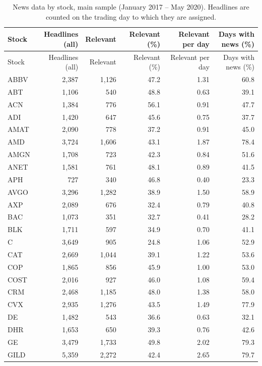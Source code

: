 \documentclass[12pt,a4paper]{article}
\begin{document}
\begin{longtable}{lrrrrr}
\caption[News data by stock, main sample]{News data by stock, main sample (January 2017 -- May 2020). Headlines are counted on the trading day to which they are assigned.}\label{tab:app-stock-news}\\
\toprule
Stock & Headlines (all) & Relevant & Relevant (\%) & Relevant per day & Days with news (\%) \\
\midrule
\endfirsthead
\toprule
Stock & Headlines (all) & Relevant & Relevant (\%) & Relevant per day & Days with news (\%) \\
\midrule
\endhead
\bottomrule
\endfoot
ABBV & 2{,}387 & 1{,}126 & 47.2 & 1.31 & 60.8 \\
ABT & 1{,}106 & 540 & 48.8 & 0.63 & 39.1 \\
ACN & 1{,}384 & 776 & 56.1 & 0.91 & 47.7 \\
ADI & 1{,}420 & 647 & 45.6 & 0.75 & 37.7 \\
AMAT & 2{,}090 & 778 & 37.2 & 0.91 & 45.0 \\
AMD & 3{,}724 & 1{,}606 & 43.1 & 1.87 & 78.4 \\
AMGN & 1{,}708 & 723 & 42.3 & 0.84 & 51.6 \\
ANET & 1{,}581 & 761 & 48.1 & 0.89 & 41.5 \\
APH & 727 & 340 & 46.8 & 0.40 & 23.3 \\
AVGO & 3{,}296 & 1{,}282 & 38.9 & 1.50 & 58.9 \\
AXP & 2{,}089 & 676 & 32.4 & 0.79 & 40.8 \\
BAC & 1{,}073 & 351 & 32.7 & 0.41 & 28.2 \\
BLK & 1{,}711 & 597 & 34.9 & 0.70 & 41.1 \\
C & 3{,}649 & 905 & 24.8 & 1.06 & 52.9 \\
CAT & 2{,}669 & 1{,}044 & 39.1 & 1.22 & 53.6 \\
COP & 1{,}865 & 856 & 45.9 & 1.00 & 53.0 \\
COST & 2{,}016 & 927 & 46.0 & 1.08 & 59.4 \\
CRM & 2{,}468 & 1{,}185 & 48.0 & 1.38 & 58.0 \\
CVX & 2{,}935 & 1{,}276 & 43.5 & 1.49 & 77.9 \\
DE & 1{,}482 & 543 & 36.6 & 0.63 & 32.1 \\
DHR & 1{,}653 & 650 & 39.3 & 0.76 & 42.6 \\
GE & 3{,}479 & 1{,}733 & 49.8 & 2.02 & 79.3 \\
GILD & 5{,}359 & 2{,}272 & 42.4 & 2.65 & 79.7 \\

\end{longtable}
\end{document}
